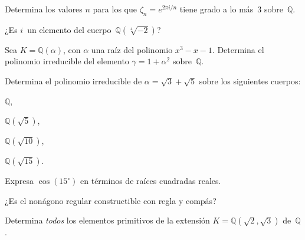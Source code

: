 \documentclass[12pt]{article}
\begin{document}
    \begin{exercise}[15.3.5]
        Determina los valores $n$ para los que $\zeta_{n}=e^{2 \pi i/n}$ tiene grado a lo más~$3$ sobre~$\mathbb{Q}$.
    \end{exercise}
    
    \begin{exercise}[15.3.7.a]
        ¿Es $i$~un elemento del cuerpo~$\mathbb{Q}(\sqrt[4]{-2})$?
    \end{exercise}
    
    \begin{exercise}[15.4.1]
        Sea $K=\mathbb{Q}(\alpha)$, con $\alpha$ una raíz del polinomio $x^{3}-x-1$. Determina el polinomio irreducible del elemento $\gamma=1+\alpha^{2}$ sobre~$\mathbb{Q}$.
    \end{exercise}
    
    \begin{exercise}[15.4.2]
        Determina el polinomio irreducible de $\alpha=\sqrt{3}+\sqrt{5}$ sobre los siguientes cuerpos:  
        
        \noindent
        \begin{inparaenum}[\bfseries(a)]
            \item $\mathbb{Q}$, 
            \item $\mathbb{Q}(\sqrt{5})$,
            \item $\mathbb{Q}(\sqrt{10})$,
            \item $\mathbb{Q}(\sqrt{15})$.
        \end{inparaenum}
    \end{exercise}
    
    \begin{exercise}[15.5.1]
        Expresa $\cos(15^{\circ})$ en términos de raíces cuadradas reales.
    \end{exercise}
    
    \begin{exercise}[15.5.3]
        ¿Es el nonágono regular constructible con regla y compás?
    \end{exercise}
    
    \begin{exercise}[15.8.2]
        Determina \emph{todos} los elementos primitivos de la extensión $K=\mathbb{Q}(\sqrt{2}, \sqrt{3})$ de~$\mathbb{Q}$.
    \end{exercise}
    
    
    
    
    
\end{document}
